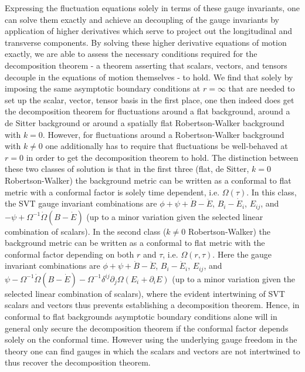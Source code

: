 Expressing the fluctuation equations solely in terms of these gauge invariants, one can solve them exactly and achieve an decoupling of the gauge invariants by application of higher derivatives which serve to project out the longitudinal and transverse components. By solving these higher derivative equations of motion exactly, we are able to assess the necessary conditions required for the decomposition theorem - a theorem asserting that scalars, vectors, and tensors decouple in the equations of motion themselves - to hold. We find that solely by imposing the same asymptotic boundary conditions at $r=\infty$ that are needed to set up the scalar, vector, tensor basis in the first place, one then indeed does get the decomposition theorem for fluctuations around a flat background, around a de Sitter background or around a spatially flat Robertson-Walker background with $k=0$. However, for fluctuations around a Robertson-Walker background with $k\neq 0$ one additionally has to require that fluctuations be well-behaved at $r=0$ in order to get the decomposition theorem to hold. The distinction between these two classes of solution is that in the first three (flat, de Sitter, $k=0$ Robertson-Walker) the background metric can be written as a conformal to flat metric with a conformal factor is solely time dependent, i.e. $\Omega(\tau)$. In this class, the SVT gauge invariant combinations are $\phi + \psi + \dot B - \ddot E$,  $B_i-\dot{E}_i$, $E_{ij}$, and $-\psi+\Omega^{-1}\dot{\Omega}(B-\dot{E})$ (up to a minor variation given the selected linear combination of scalars). In the second class ($k\neq 0$ Robertson-Walker) the background metric can be written as a conformal to flat metric with the conformal factor depending on both $r$ and $\tau$, i.e. $\Omega(r,\tau)$. Here the gauge invariant combinations are $\phi + \psi + \dot B - \ddot E$,  $B_i-\dot{E}_i$, $E_{ij}$, and $\psi-\Omega^{-1}\dot{\Omega}(B-\dot{E})-\Omega^{-1}\delta^{ij}\partial_j\Omega(E_i+\partial_iE)$ (up to a minor variation given the selected linear combination of scalars), where the evident intertwining of SVT scalars and vectors thus prevents establishing a decomposition theorem. Hence, in conformal to flat backgrounds asymptotic boundary conditions alone will in general only secure the decomposition theorem if the conformal factor depends solely on the conformal time. However using the underlying gauge freedom in the theory one can find gauges in which the scalars and vectors are not intertwined to thus recover the decomposition theorem.

